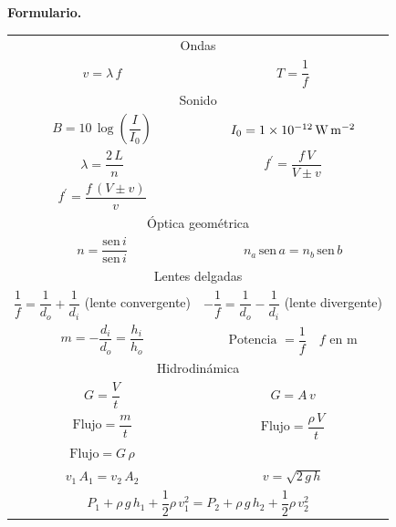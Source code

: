 \documentclass[12pt, letter]{exam}
\begin{document}
\textbf{\huge{Formulario.}}
\begin{table}[H]
    \centering
    \setlength{\tabcolsep}{40pt}
    \renewcommand{\arraystretch}{2.5}
    \begin{tabular}{c  c}
        \multicolumn{2}{c}{Ondas} \\
        $v = \lambda \, f$ & $T = \dfrac{1}{f}$ \\ \hline
        \multicolumn{2}{c}{Sonido} \\
        $B = 10 \, \log \left( \dfrac{I}{I_{0}} \right)$ & $I_{0} = \SI{1d-12}{\watt\per\square\meter}$ \\
        $\lambda = \dfrac{2 \, L}{n}$ & $f^{\prime} = \dfrac{f \, V}{V \pm v}$ \\
        $f^{\prime} = \dfrac{f \, (V \pm v)}{v}$ & \\ \hline
        \multicolumn{2}{c}{Óptica geométrica} \\
        $n = \dfrac{\text{sen} \, i}{\text{sen} \, i}$ & $n_{a} \, \text{sen} \,  a = n_{b} \, \text{sen} \,  b$ \\ \hline
        \multicolumn{2}{c}{Lentes delgadas} \\
        $\dfrac{1}{f} = \dfrac{1}{d_{o}} + \dfrac{1}{d_{i}}$ (lente convergente) & $- \dfrac{1}{f} = \dfrac{1}{d_{o}} - \dfrac{1}{d_{i}}$ (lente divergente) \\
        $m = - \dfrac{d_{i}}{d_{o}} = \dfrac{h_{i}}{h_{o}}$ & $\text{Potencia } = \dfrac{1}{f} \quad f \text{ en } \unit{\meter}$ \\ \hline
        \multicolumn{2}{c}{Hidrodinámica} \\
        $G = \dfrac{V}{t}$ & $G = A \, v$ \\
        $\text{Flujo} = \dfrac{m}{t}$ & $\text{Flujo} = \dfrac{\rho \, V}{t}$ \\
        $\text{Flujo} = G \, \rho$ & \\
        $v_{1} \, A_{1} = v_{2} \, A_{2}$ & $v = \sqrt{2 \, g \, h}$ \\
        \multicolumn{2}{c}{$P_{1} + \rho \, g \, h_{1} + \dfrac{1}{2} \rho \, v_{1}^{2} = P_{2} + \rho \, g \, h_{2} + \dfrac{1}{2} \rho \, v_{2}^{2}$}
    \end{tabular}
\end{table}

\newpage
\end{document}
